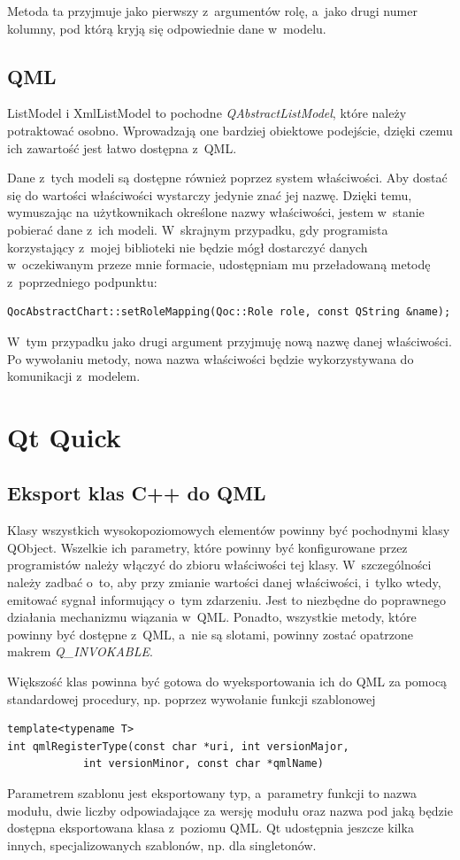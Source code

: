Metoda ta przyjmuje jako pierwszy z~argumentów rolę, a~jako drugi numer kolumny, pod którą kryją się odpowiednie dane w~modelu.


\subsection{QML}
ListModel i XmlListModel to pochodne \textit{QAbstractListModel}, które należy potraktować osobno. Wprowadzają one bardziej obiektowe podejście, dzięki czemu ich zawartość jest łatwo dostępna z~QML.

Dane z~tych modeli są dostępne również poprzez system właściwości. Aby dostać się do wartości właściwości wystarczy jedynie znać jej nazwę. Dzięki temu, wymuszając na użytkownikach określone nazwy właściwości, jestem w~stanie pobierać dane z~ich modeli. W~skrajnym przypadku, gdy programista korzystający z~mojej biblioteki nie będzie mógł dostarczyć danych w~oczekiwanym przeze mnie formacie, udostępniam mu przeładowaną metodę z~poprzedniego podpunktu:

\begin{lstlisting}
QocAbstractChart::setRoleMapping(Qoc::Role role, const QString &name);
\end{lstlisting}

W~tym przypadku jako drugi argument przyjmuję nową nazwę danej właściwości. Po wywołaniu metody, nowa nazwa właściwości będzie wykorzystywana do komunikacji z~modelem.


\section{Qt Quick}

\subsection{Eksport klas C++ do QML}
Klasy wszystkich wysokopoziomowych elementów powinny być pochodnymi klasy QObject. Wszelkie ich parametry, które powinny być konfigurowane przez programistów należy włączyć do zbioru właściwości tej klasy. W~szczególności należy zadbać o~to, aby przy zmianie wartości danej właściwości, i~tylko wtedy, emitować sygnał informujący o~tym zdarzeniu. Jest to niezbędne do poprawnego działania mechanizmu wiązania w~QML. Ponadto, wszystkie metody, które powinny być dostępne z~QML, a~nie są slotami, powinny zostać opatrzone makrem \textit{Q\_INVOKABLE}.

Większość klas powinna być gotowa do wyeksportowania ich do QML za pomocą standardowej procedury, np. poprzez wywołanie funkcji szablonowej
\begin{verbatim}
template<typename T>
int qmlRegisterType(const char *uri, int versionMajor, 
		    int versionMinor, const char *qmlName)
\end{verbatim}
Parametrem szablonu jest eksportowany typ, a~parametry funkcji to nazwa modułu, dwie liczby odpowiadające za wersję modułu oraz nazwa pod jaką będzie dostępna eksportowana klasa z~poziomu QML. Qt udostępnia jeszcze kilka innych, specjalizowanych szablonów, np. dla singletonów.

